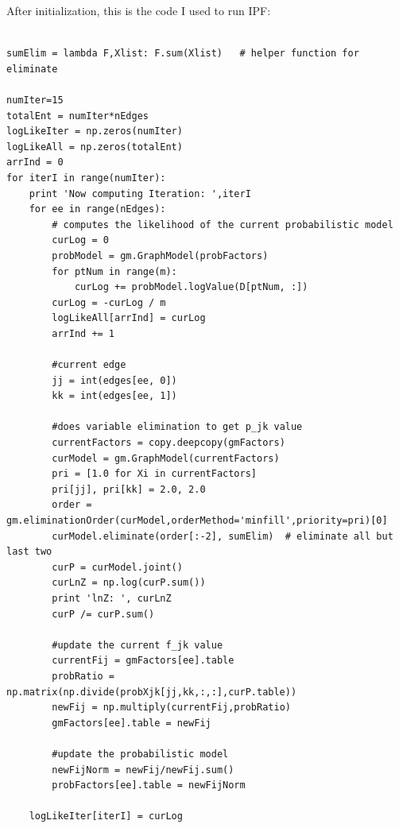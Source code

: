 \documentclass[twoside,11pt]{article}
\theoremstyle{definition}
\begin{document}
\newpage

After initialization, this is the code I used to run IPF:

\begin{lstlisting}

sumElim = lambda F,Xlist: F.sum(Xlist)   # helper function for eliminate

numIter=15
totalEnt = numIter*nEdges
logLikeIter = np.zeros(numIter)
logLikeAll = np.zeros(totalEnt)
arrInd = 0
for iterI in range(numIter):
    print 'Now computing Iteration: ',iterI
    for ee in range(nEdges):
        # computes the likelihood of the current probabilistic model
        curLog = 0
        probModel = gm.GraphModel(probFactors)
        for ptNum in range(m):
            curLog += probModel.logValue(D[ptNum, :])
        curLog = -curLog / m
        logLikeAll[arrInd] = curLog
        arrInd += 1

        #current edge
        jj = int(edges[ee, 0])
        kk = int(edges[ee, 1])

        #does variable elimination to get p_jk value
        currentFactors = copy.deepcopy(gmFactors)
        curModel = gm.GraphModel(currentFactors)
        pri = [1.0 for Xi in currentFactors]
        pri[jj], pri[kk] = 2.0, 2.0
        order = gm.eliminationOrder(curModel,orderMethod='minfill',priority=pri)[0]
        curModel.eliminate(order[:-2], sumElim)  # eliminate all but last two
        curP = curModel.joint()
        curLnZ = np.log(curP.sum())
        print 'lnZ: ', curLnZ
        curP /= curP.sum()

        #update the current f_jk value
        currentFij = gmFactors[ee].table
        probRatio = np.matrix(np.divide(probXjk[jj,kk,:,:],curP.table))
        newFij = np.multiply(currentFij,probRatio)
        gmFactors[ee].table = newFij

        #update the probabilistic model
        newFijNorm = newFij/newFij.sum()
        probFactors[ee].table = newFijNorm

    logLikeIter[iterI] = curLog

\end{lstlisting}
\end{document}
